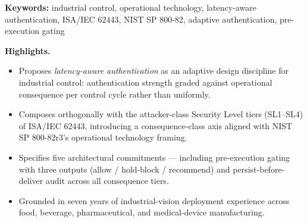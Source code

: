 \begin{abstract}
\noindent Authentication patterns developed for web and cloud environments ---
OAuth round-trips, TLS handshakes, multi-factor authentication
challenges --- often assume tens to hundreds of milliseconds of
permissible latency per authorization event. Industrial control
environments operate on fundamentally tighter budgets. Machine vision
inspection loops can run on single-millisecond timescales; programmable
logic controller (PLC) scan cycles are measured in milliseconds;
real-time motion-control decisions may admit no perceptible
authentication overhead at all. The result is a recurring
industrial-control gap: authentication is either applied at the
perimeter and absent inside the control loop, or it is grafted on with
timing penalties that operators and integrators are incentivized to
bypass. This paper proposes \emph{latency-aware authentication} as an
adaptive design discipline for industrial control environments:
authentication strength is graded against operational consequence per
control cycle rather than applied uniformly. The discipline complements
the attacker-class security level tiers (SL1--SL4) of ISA/IEC 62443
\cite{ref1} with an orthogonal consequence-class axis, and operates within
the operational technology security framing of NIST SP 800-82r3 \cite{ref2}.
The paper is grounded in the author's hands-on industrial vision
deployment experience across food, beverage, pharmaceutical, and
medical-device manufacturing domains, and illustrated using MILO, a
patent-pending adaptive AI orchestrator \cite{ref3} whose pre-execution
gating subsystem implements the discipline in software.
\end{abstract}

\noindent\textbf{Keywords:} industrial control, operational technology,
latency-aware authentication, ISA/IEC 62443, NIST SP 800-82, adaptive
authentication, pre-execution gating\par

\textbf{Highlights.}

\begin{itemize}
\tightlist
\item
  Proposes \emph{latency-aware authentication} as an adaptive design
  discipline for industrial control: authentication strength graded
  against operational consequence per control cycle rather than
  uniformly.
\item
  Composes orthogonally with the attacker-class Security Level tiers
  (SL1--SL4) of ISA/IEC 62443, introducing a consequence-class axis
  aligned with NIST SP 800-82r3's operational technology framing.
\item
  Specifies five architectural commitments --- including pre-execution
  gating with three outputs (allow / hold-block / recommend) and
  persist-before-deliver audit across all consequence tiers.
\item
  Grounded in seven years of industrial-vision deployment experience
  across food, beverage, pharmaceutical, and medical-device
  manufacturing.
\end{itemize}

